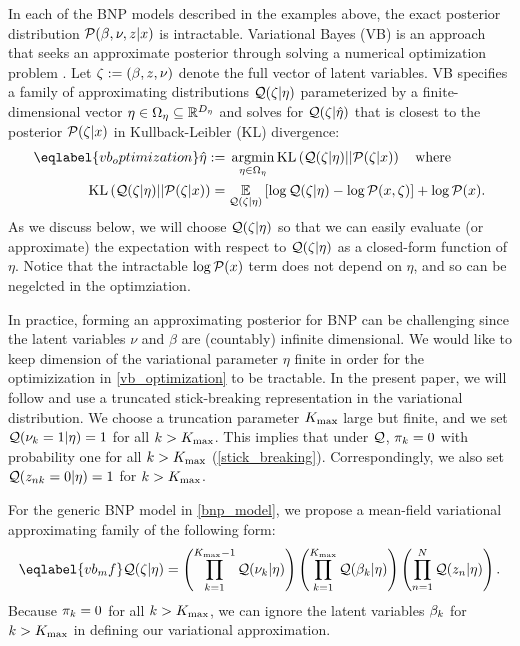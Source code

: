 In each of the BNP models described in the examples above,
the exact posterior distribution $\mathcal{P}(\beta, \nu, z \vert x)$
is intractable.
Variational Bayes (VB) is an approach that seeks an approximate posterior
through solving a numerical optimization problem
\citep{jordan:1999:vi, wainwright:2008:graphical_models, blei:2017:vi_review}.
Let $\zeta := (\beta, z, \nu)$ denote the full vector of
latent variables.
VB specifies a
family of approximating distributions $\mathcal{Q}(\zeta \vert \eta)$
parameterized by a finite-dimensional vector $\eta \in \Omega_{\eta} \subseteq
\mathbb{R}^{{D_{\eta}}}$
and solves for $\mathcal{Q}(\zeta\vert\hat\eta)$
that is closest to the posterior $\mathcal{P}(\zeta \vert x)$ in
Kullback-Leibler (KL) divergence:
%
\begin{align}\eqlabel{vb_optimization}
%
\etaopt :={}&
    \argmin_{\eta \in \etadom}
        \KL{\q(\zeta \vert \eta) || \p(\zeta \vert \x)} \mathwhere \\
\KL{\q(\zeta \vert \eta) || \p(\zeta \vert \x)}
={}&    \expect{\q(\zeta \vert \eta)}{
        \log \q(\zeta \vert \eta) - \logp(\x, \zeta)} + \logp(\x). \nonumber
%
\end{align}
%
As we discuss
below, we will choose $\mathcal{Q}(\zeta \vert \eta)$ so that we can easily evaluate (or approximate)
the expectation with respect to $\mathcal{Q}(\zeta \vert \eta)$
as a closed-form function of $\eta$.
Notice that the intractable $\log \mathcal{P}(x)$ term does not depend on $\eta$, and
so can be negelcted in the optimziation.

In practice, forming an approximating posterior for BNP
can be challenging since the latent variables $\nu$ and $\beta$ are
(countably) infinite dimensional.
We would like to keep dimension of the variational parameter $\eta$ finite
in order for the optimizization in \eqref{vb_optimization} to be tractable.
In the present paper, we will follow \citet{blei:2006:vi_for_dp} and
use a truncated stick-breaking representation in
the variational distribution.
We choose a truncation parameter ${K_{\mathrm{max}}}$ large but finite,
and we set $\mathcal{Q}(\nu_k = 1 | \eta) = 1$ for all $k > {K_{\mathrm{max}}}$.
This implies that under $\mathcal{Q}$, $\pi_k = 0$ with probability one
for all $k > {K_{\mathrm{max}}}$
(\eqref{stick_breaking}).
Correspondingly, we also set $\mathcal{Q}(z_{nk} = 0 | \eta) = 1$ for $k > {K_{\mathrm{max}}}$.

For the generic BNP model in \eqref{bnp_model},
we propose a mean-field variational approximating family of the following form:
%
\begin{align}\eqlabel{vb_mf}
%
\q(\zeta \vert \eta) =
    \left( \prod_{\k=1}^{\kmax - 1} \q(\nuk \vert \eta) \right)
    \left( \prod_{\k=1}^{\kmax} \q(\beta_\k \vert \eta) \right)
    \left( \prod_{\n=1}^{\N} \q(\z_{\n} \vert \eta) \right).
%
\end{align}
Because $\pi_k = 0$ for all $k > {K_{\mathrm{max}}}$,
we can ignore the latent variables $\beta_k$ for $k > {K_{\mathrm{max}}}$ in
defining our variational approximation.

